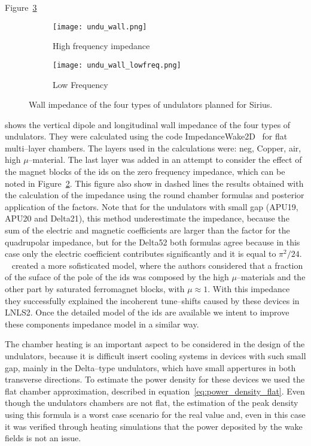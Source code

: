     Figure~\ref{fig:undu_wall}
    \begin{figure}[b]
        \centering
        \begin{subfigure}[c]{0.65\textwidth}
            \centering
            \texttt{[image: undu\_wall.png]}
            \caption{High frequency impedance}
            \label{fig:undu_wall_highfreq}
        \end{subfigure}
        \begin{subfigure}[c]{0.34\textwidth}
            \centering
            \texttt{[image: undu\_wall\_lowfreq.png]}
            \caption{Low Frequency}
            \label{fig:undu_wall_lowfreq}
        \end{subfigure}
        \caption{Wall impedance of the four types of undulators planned for Sirius.}
        \label{fig:undu_wall}
    \end{figure}
    shows the vertical dipole and longitudinal wall impedance of the four types of undulators. They were calculated using the code ImpedanceWake2D~\cite{Mounet2011} for flat multi--layer chambers. The layers used in the calculations were: \gls{neg}, Copper, air, high $\mu$--material. The last layer was added in an attempt to consider the effect of the magnet blocks of the \gls{ids} on the zero frequency impedance, which can be noted in Figure~\ref{fig:undu_wall_lowfreq}. This figure also show in dashed lines the results obtained with the calculation of the impedance using the round chamber formulas and posterior application of the \citeauthor{Yokoya1993} factors. Note that for the undulators with small gap (APU19, APU20 and Delta21), this method underestimate the impedance, because the sum of the electric and magnetic \citeauthor{Laslett1963} coefficients are larger than the factor for the quadrupolar impedance, but for the Delta52 both formulas agree because in this case only the electric coefficient contributes significantly and it is equal to $\pi^2/24$.
    ~ created a more sofisticated model, where the authors considered that a fraction of the suface of the pole of the \gls{ids} was composed by the high $\mu$--materials and the other part by saturated ferromagnet blocks, with $\mu\approx1$. With this impedance they successfully explained the incoherent tune--shifts caused by these devices in LNLS2. Once the detailed model of the \gls{ids} are available we intent to improve these components impedance model in a similar way.

    The chamber heating is an important aspect to be considered in the design of the undulators, because it is difficult insert cooling systems in devices with such small gap, mainly in the Delta--type undulators, which have small appertures in both transverse directions. To estimate the power density for these devices we used the flat chamber approximation, described in equation~\eqref{eq:power_density_flat}. Even though the undulators chambers are not flat, the estimation of the peak density using this formula is a worst case scenario for the real value and, even in this case it was verified through heating simulations that the power deposited by the wake fields is not an issue.

